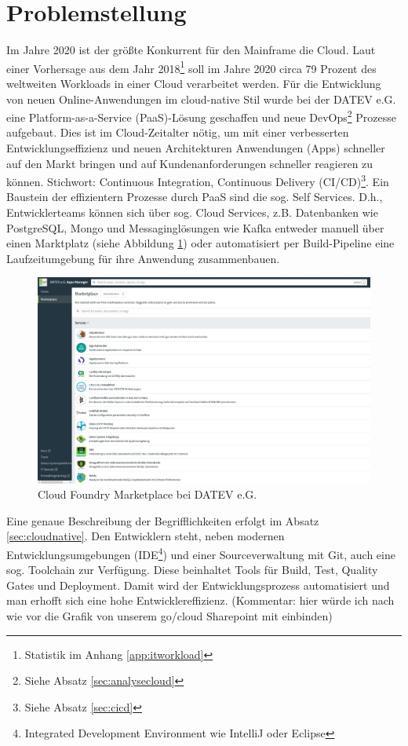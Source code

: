 \section{Problemstellung}\label{sec:probstell}
Im Jahre 2020 ist der größte Konkurrent für den Mainframe die Cloud.
Laut einer Vorhersage aus dem Jahr 2018\footnote{Statistik im Anhang \ref{app:itworkload}} soll im Jahre 2020 circa 79 Prozent des weltweiten Workloads in einer Cloud verarbeitet werden.
Für die Entwicklung von neuen Online-Anwendungen im cloud-native Stil wurde bei der DATEV e.G. eine Platform-as-a-Service (PaaS)-Lösung geschaffen und neue DevOps\footnote{Siehe Absatz \ref{sec:analysecloud}} Prozesse aufgebaut.
Dies ist im Cloud-Zeitalter nötig, um mit einer verbesserten Entwicklungseffizienz und neuen Architekturen Anwendungen (\glqq Apps\grqq) schneller auf den Markt bringen und auf Kundenanforderungen schneller reagieren zu können. Stichwort: Continuous Integration, Continuous Delivery (CI/CD)\footnote{Siehe Absatz \ref{sec:cicd}}.
Ein Baustein der effizientern Prozesse durch PaaS sind die sog. \glqq Self Services\grqq.
D.h., Entwicklerteams können sich über sog. \glqq Cloud Services\grqq, z.B. Datenbanken wie PostgreSQL, Mongo und Messaginglösungen wie Kafka entweder manuell über einen Marktplatz (siehe Abbildung \ref{fig:markt}) oder automatisiert per \glqq Build-Pipeline\grqq{} eine  Laufzeitumgebung für ihre Anwendung zusammenbauen.
\begin{figure}[h]
\centering
\includegraphics[width=\textwidth]{figures/CFMarketplace.jpg}
\caption{Cloud Foundry Marketplace bei DATEV e.G.}
\label{fig:markt}
\end{figure}
Eine genaue Beschreibung der Begrifflichkeiten erfolgt im Absatz \ref{sec:cloudnative}.
Den Entwicklern steht, neben modernen Entwicklungsumgebungen (IDE\footnote{Integrated Development Environment wie IntelliJ oder Eclipse}) und einer Sourceverwaltung mit Git, auch eine sog. \glqq Toolchain\grqq{} zur Verfügung. Diese beinhaltet Tools für Build, Test, Quality Gates und Deployment. 
Damit wird der Entwicklungsprozess automatisiert und man erhofft sich eine hohe Entwicklereffizienz. (Kommentar: hier würde ich nach wie vor die Grafik von unserem go/cloud Sharepoint mit einbinden)

